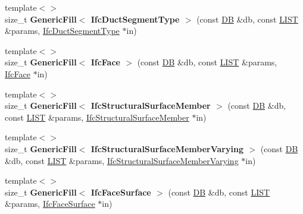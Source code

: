 \begin{DoxyCompactItemize}
\item 
\hypertarget{namespace_assimp_1_1_s_t_e_p_a253b6cc487e065af9995092fd927239c}{{\footnotesize template$<$$>$ }\\size\+\_\+t {\bfseries Generic\+Fill$<$ Ifc\+Duct\+Segment\+Type $>$} (const \hyperlink{class_assimp_1_1_s_t_e_p_1_1_d_b}{D\+B} \&db, const \hyperlink{class_assimp_1_1_s_t_e_p_1_1_e_x_p_r_e_s_s_1_1_l_i_s_t}{L\+I\+S\+T} \&params, \hyperlink{struct_assimp_1_1_i_f_c_1_1_ifc_duct_segment_type}{Ifc\+Duct\+Segment\+Type} $\ast$in)}\label{namespace_assimp_1_1_s_t_e_p_a253b6cc487e065af9995092fd927239c}

\item 
\hypertarget{namespace_assimp_1_1_s_t_e_p_afa8aa37e89fa26997df7d4d1976b19ec}{{\footnotesize template$<$$>$ }\\size\+\_\+t {\bfseries Generic\+Fill$<$ Ifc\+Face $>$} (const \hyperlink{class_assimp_1_1_s_t_e_p_1_1_d_b}{D\+B} \&db, const \hyperlink{class_assimp_1_1_s_t_e_p_1_1_e_x_p_r_e_s_s_1_1_l_i_s_t}{L\+I\+S\+T} \&params, \hyperlink{struct_assimp_1_1_i_f_c_1_1_ifc_face}{Ifc\+Face} $\ast$in)}\label{namespace_assimp_1_1_s_t_e_p_afa8aa37e89fa26997df7d4d1976b19ec}

\item 
\hypertarget{namespace_assimp_1_1_s_t_e_p_aefc6c972ece2eb1f5a98dd709e003c8d}{{\footnotesize template$<$$>$ }\\size\+\_\+t {\bfseries Generic\+Fill$<$ Ifc\+Structural\+Surface\+Member $>$} (const \hyperlink{class_assimp_1_1_s_t_e_p_1_1_d_b}{D\+B} \&db, const \hyperlink{class_assimp_1_1_s_t_e_p_1_1_e_x_p_r_e_s_s_1_1_l_i_s_t}{L\+I\+S\+T} \&params, \hyperlink{struct_assimp_1_1_i_f_c_1_1_ifc_structural_surface_member}{Ifc\+Structural\+Surface\+Member} $\ast$in)}\label{namespace_assimp_1_1_s_t_e_p_aefc6c972ece2eb1f5a98dd709e003c8d}

\item 
\hypertarget{namespace_assimp_1_1_s_t_e_p_a6733228c74a75fd3d652203ffbce0a38}{{\footnotesize template$<$$>$ }\\size\+\_\+t {\bfseries Generic\+Fill$<$ Ifc\+Structural\+Surface\+Member\+Varying $>$} (const \hyperlink{class_assimp_1_1_s_t_e_p_1_1_d_b}{D\+B} \&db, const \hyperlink{class_assimp_1_1_s_t_e_p_1_1_e_x_p_r_e_s_s_1_1_l_i_s_t}{L\+I\+S\+T} \&params, \hyperlink{struct_assimp_1_1_i_f_c_1_1_ifc_structural_surface_member_varying}{Ifc\+Structural\+Surface\+Member\+Varying} $\ast$in)}\label{namespace_assimp_1_1_s_t_e_p_a6733228c74a75fd3d652203ffbce0a38}

\item 
\hypertarget{namespace_assimp_1_1_s_t_e_p_a8bb027ce3e948bf749adf6f9340c84b5}{{\footnotesize template$<$$>$ }\\size\+\_\+t {\bfseries Generic\+Fill$<$ Ifc\+Face\+Surface $>$} (const \hyperlink{class_assimp_1_1_s_t_e_p_1_1_d_b}{D\+B} \&db, const \hyperlink{class_assimp_1_1_s_t_e_p_1_1_e_x_p_r_e_s_s_1_1_l_i_s_t}{L\+I\+S\+T} \&params, \hyperlink{struct_assimp_1_1_i_f_c_1_1_ifc_face_surface}{Ifc\+Face\+Surface} $\ast$in)}\label{namespace_assimp_1_1_s_t_e_p_a8bb027ce3e948bf749adf6f9340c84b5}


\end{DoxyCompactItemize}
